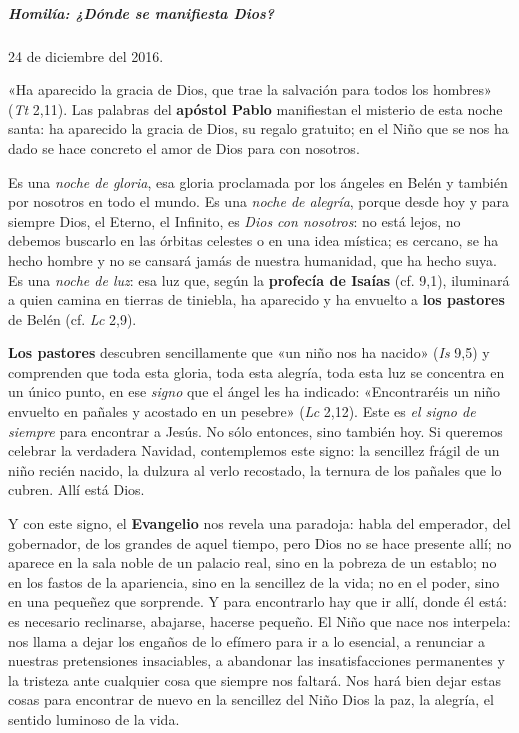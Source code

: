 \documentclass[]{article}
\let\oldsubparagraph\subparagraph
\renewcommand{\subparagraph}[1]{\oldsubparagraph{#1}\mbox{}}
\begin{document}
\subparagraph{Homilía: ¿Dónde se manifiesta
Dios?}\label{homiluxeda-duxf3nde-se-manifiesta-dios}

24 de diciembre del 2016.

«Ha aparecido la gracia de Dios, que trae la salvación para todos los
hombres» (\emph{Tt} 2,11). Las palabras del \textbf{apóstol Pablo}
manifiestan el misterio de esta noche santa: ha aparecido la gracia de
Dios, su regalo gratuito; en el Niño que se nos ha dado se hace concreto
el amor de Dios para con nosotros.

Es una \emph{noche de gloria}, esa gloria proclamada por los ángeles en
Belén y también por nosotros en todo el mundo. Es una \emph{noche de
alegría}, porque desde hoy y para siempre Dios, el Eterno, el Infinito,
es \emph{Dios con nosotros}: no está lejos, no debemos buscarlo en las
órbitas celestes o en una idea mística; es cercano, se ha hecho hombre y
no se cansará jamás de nuestra humanidad, que ha hecho suya. Es una
\emph{noche de luz}: esa luz que, según la \textbf{profecía de Isaías}
(cf. 9,1), iluminará a quien camina en tierras de tiniebla, ha aparecido
y ha envuelto a \textbf{los pastores} de Belén (cf. \emph{Lc} 2,9).

\textbf{Los pastores} descubren sencillamente que «un niño nos ha
nacido» (\emph{Is} 9,5) y comprenden que toda esta gloria, toda esta
alegría, toda esta luz se concentra en un único punto, en ese
\emph{signo} que el ángel les ha indicado: «Encontraréis un niño
envuelto en pañales y acostado en un pesebre» (\emph{Lc} 2,12). Este es
\emph{el signo de siempre} para encontrar a Jesús. No sólo entonces,
sino también hoy. Si queremos celebrar la verdadera Navidad,
contemplemos este signo: la sencillez frágil de un niño recién nacido,
la dulzura al verlo recostado, la ternura de los pañales que lo cubren.
Allí está Dios.

Y con este signo, el \textbf{Evangelio} nos revela una paradoja: habla
del emperador, del gobernador, de los grandes de aquel tiempo, pero Dios
no se hace presente allí; no aparece en la sala noble de un palacio
real, sino en la pobreza de un establo; no en los fastos de la
apariencia, sino en la sencillez de la vida; no en el poder, sino en una
pequeñez que sorprende. Y para encontrarlo hay que ir allí, donde él
está: es necesario reclinarse, abajarse, hacerse pequeño. El Niño que
nace nos interpela: nos llama a dejar los engaños de lo efímero para ir
a lo esencial, a renunciar a nuestras pretensiones insaciables, a
abandonar las insatisfacciones permanentes y la tristeza ante cualquier
cosa que siempre nos faltará. Nos hará bien dejar estas cosas para
encontrar de nuevo en la sencillez del Niño Dios la paz, la alegría, el
sentido luminoso de la vida.
\end{document}
